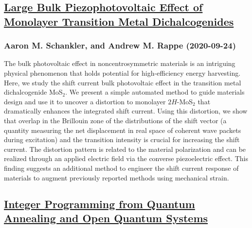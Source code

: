 \subsection*{\href{http://arxiv.org/abs/2009.11980v1}{Large Bulk Piezophotovoltaic Effect of Monolayer Transition Metal  Dichalcogenides}}
\subsubsection*{Aaron M. Schankler, and Andrew M. Rappe (2020-09-24)}
The bulk photovoltaic effect in noncentrosymmetric materials is an intriguing
physical phenomenon that holds potential for high-efficiency energy harvesting.
Here, we study the shift current bulk photovoltaic effect in the transition
metal dichalcogenide MoS$_2$. We present a simple automated method to guide
materials design and use it to uncover a distortion to monolayer $2H$-MoS$_2$
that dramatically enhances the integrated shift current. Using this distortion,
we show that overlap in the Brillouin zone of the distributions of the shift
vector (a quantity measuring the net displacement in real space of coherent
wave packets during excitation) and the transition intensity is crucial for
increasing the shift current. The distortion pattern is related to the material
polarization and can be realized through an applied electric field via the
converse piezoelectric effect. This finding suggests an additional method to
engineer the shift current response of materials to augment previously reported
methods using mechanical strain.

\subsection*{\href{http://arxiv.org/abs/2009.11970v1}{Integer Programming from Quantum Annealing and Open Quantum Systems}}
